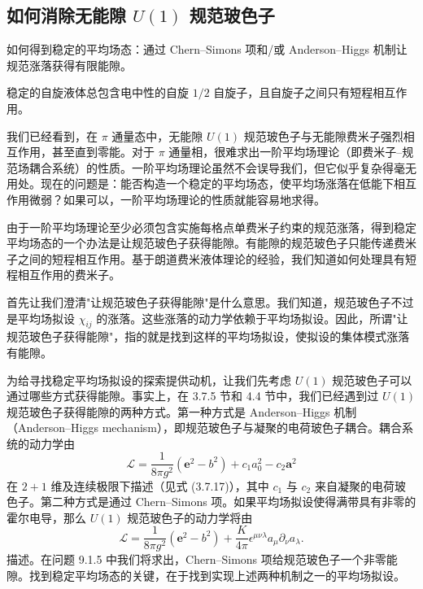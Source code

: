 \subsection{如何消除无能隙 $U(1)$ 规范玻色子}

\begin{keypoints}
\item 如何得到稳定的平均场态：通过 Chern--Simons 项和/或 Anderson--Higgs 机制让规范涨落获得有限能隙。
\item 稳定的自旋液体总包含电中性的自旋 $1/2$ 自旋子，且自旋子之间只有短程相互作用。
\end{keypoints}

我们已经看到，在 $\pi$ 通量态中，无能隙 $U(1)$ 规范玻色子与无能隙费米子强烈相互作用，甚至直到零能。对于 $\pi$ 通量相，很难求出一阶平均场理论（即费米子--规范场耦合系统）的性质。一阶平均场理论虽然不会误导我们，但它似乎复杂得毫无用处。现在的问题是：能否构造一个稳定的平均场态，使平均场涨落在低能下相互作用微弱？如果可以，一阶平均场理论的性质就能容易地求得。

由于一阶平均场理论至少必须包含实施每格点单费米子约束的规范涨落，得到稳定平均场态的一个办法是让规范玻色子获得能隙。有能隙的规范玻色子只能传递费米子之间的短程相互作用。基于朗道费米液体理论的经验，我们知道如何处理具有短程相互作用的费米子。

首先让我们澄清"让规范玻色子获得能隙"是什么意思。我们知道，规范玻色子不过是平均场拟设 $\chi_{ij}$ 的涨落。这些涨落的动力学依赖于平均场拟设。因此，所谓"让规范玻色子获得能隙"，指的就是找到这样的平均场拟设，使拟设的集体模式涨落有能隙。

为给寻找稳定平均场拟设的探索提供动机，让我们先考虑 $U(1)$ 规范玻色子可以通过哪些方式获得能隙。事实上，在 3.7.5 节和 4.4 节中，我们已经遇到过 $U(1)$ 规范玻色子获得能隙的两种方式。第一种方式是 Anderson--Higgs 机制（Anderson--Higgs mechanism），即规范玻色子与凝聚的电荷玻色子耦合。耦合系统的动力学由
\begin{equation*}
\mathcal{L}=\frac{1}{8\pi g^2}(\mathbf{e}^2-b^2)+c_1a_0^2-c_2\pmb{a}^2
\end{equation*}
在 $2+1$ 维及连续极限下描述（见式 (3.7.17)），其中 $c_1$ 与 $c_2$ 来自凝聚的电荷玻色子。第二种方式是通过 Chern--Simons 项。如果平均场拟设使得满带具有非零的霍尔电导，那么 $U(1)$ 规范玻色子的动力学将由
\begin{equation*}
\mathcal{L}=\frac{1}{8\pi g^2}(\mathbf{e}^2-b^2)+\frac{K}{4\pi}\epsilon^{\mu\nu\lambda}a_{\mu}\partial_{\nu}a_{\lambda}.
\tag{9.1.21}
\end{equation*}
描述。在问题 9.1.5 中我们将求出，Chern--Simons 项给规范玻色子一个非零能隙。找到稳定平均场态的关键，在于找到实现上述两种机制之一的平均场拟设。


